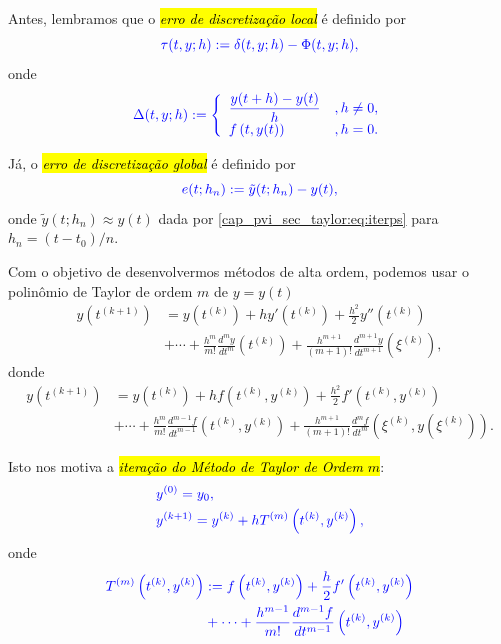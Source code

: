 Antes, lembramos que o \hl{\emph{erro de discretização local}} é definido por
\begin{equation}\color{blue}\tau(t, y; h) := \delta(t, y; h) - \Phi(t, y; h),
\end{equation}
onde
\begin{equation}\color{blue}\Delta(t, y; h) := \left\{
    \begin{array}{ll}
      \displaystyle\frac{y(t+h) - y(t)}{h} &, h\neq 0,\\
      f\left(t, y(t)\right) &, h=0.
    \end{array}
  \right.
\end{equation}

Já, o \hl{\emph{erro de discretização global}} é definido por
\begin{equation}\color{blue}e(t; h_n) := \tilde{y}(t; h_n) - y(t),
\end{equation}
onde $\tilde{y}(t; h_n) \approx y(t)$ dada por \eqref{cap_pvi_sec_taylor:eq:iterps} para $h_n = (t-t_0)/n$.

Com o objetivo de desenvolvermos métodos de alta ordem, podemos usar o polinômio de Taylor de ordem $m$ de $y=y(t)$
\begin{equation}
  \begin{aligned}
    y\left(t^{(k+1)}\right) &= y\left(t^{(k)}\right) + hy'\left(t^{(k)}\right) + \frac{h^2}{2}y''\left(t^{(k)}\right)\\
    &+ \cdots + \frac{h^m}{m!}\frac{d^m y}{d t^m}\left(t^{(k)}\right) + \frac{h^{m+1}}{(m+1)!}\frac{d^{m+1} y}{d t^{m+1}}\left(\xi^{(k)}\right),
  \end{aligned}
\end{equation}
donde
\begin{equation}
  \begin{aligned}
    y\left(t^{(k+1)}\right) &= y\left(t^{(k)}\right) + hf\left(t^{(k)}, y^{(k)}\right) + \frac{h^2}{2}f'\left(t^{(k)}, y^{(k)}\right) \\
    &+ \cdots + \frac{h^m}{m!}\frac{d^{m-1} f}{d t^{m-1}}\left(t^{(k)}, y^{(k)}\right) + \frac{h^{m+1}}{(m+1)!}\frac{d^{m} f}{d t^{m}}\left(\xi^{(k)}, y\left(\xi^{(k)}\right)\right).
  \end{aligned}
\end{equation}

Isto nos motiva a \hl{\emph{iteração do Método de Taylor de Ordem $m$}}:
\begin{subequations}\hleq
  \begin{align}
    &y^{(0)} = y_0,\\
    &y^{(k+1)} = y^{(k)} + hT^{(m)}\left(t^{(k)}, y^{(k)}\right),
  \end{align}  
\end{subequations}
onde
\begin{equation}\color{blue}\begin{aligned}
    T^{(m)}\left(t^{(k)}, y^{(k)}\right) &:= f\left(t^{(k)}, y^{(k)}\right) + \frac{h}{2}f'\left(t^{(k)}, y^{(k)}\right)\\
    &+ \cdots + \frac{h^{m-1}}{m!}\frac{d^{m-1} f}{d t^{m-1}}\left(t^{(k)}, y^{(k)}\right)
\end{aligned}
\end{equation}

